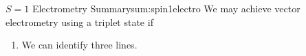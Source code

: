 %



\begin{summary}{$S=1$ Electrometry Summary}{sum:spin1electro}
	We may achieve vector electrometry using a triplet state if
	\begin{enumerate}
		\item We can identify three lines.
	\end{enumerate}
\end{summary}
